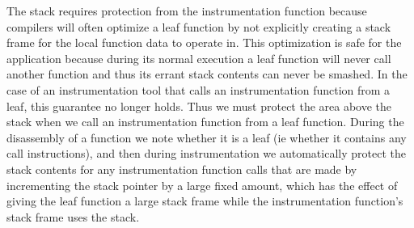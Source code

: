 The stack requires protection from the instrumentation function because compilers will often optimize a leaf function
by not explicitly creating a stack frame for the local function data to operate in. This optimization is safe for the application because during its
normal execution a leaf function will never call another function and thus its errant stack contents can never be smashed. In the case of an instrumentation
tool that calls an instrumentation function from a leaf, this guarantee no longer holds. Thus we must protect the area above the stack when we call
an instrumentation function from a leaf function. During the disassembly of a function we note whether it is a leaf (ie whether it contains any call
instructions), and then during instrumentation we automatically protect the stack contents for any instrumentation function calls that are made by
incrementing the stack pointer by a large fixed amount, which has the effect of giving the leaf function a large stack frame while the instrumentation
function's stack frame uses the stack.



